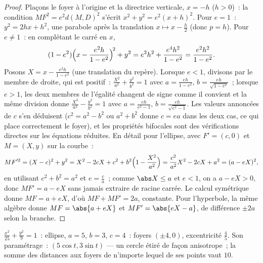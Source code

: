 \begin{proof}
Plaçons le foyer à l'origine et la directrice verticale, $x = -h$
($h > 0$)~: la condition $MF^2 = e^2 d(M, D)^2$ s'écrit $x^2 + y^2 =
e^2 (x + h)^2$. Pour $e = 1$~: $y^2 = 2hx + h^2$, une parabole après la
translation $x \mapsto x - \frac h2$ (donc $p = h$). Pour $e \neq 1$~:
en complétant le carré en $x$,
\[
(1 - e^2)\Bigl(x - \frac{e^2 h}{1 - e^2}\Bigr)^{\!2} + y^2
= e^2h^2 + \frac{e^4 h^2}{1 - e^2}
= \frac{e^2 h^2}{1 - e^2} .
\]
Posons $X = x - \frac{e^2h}{1-e^2}$ (une translation du repère). Lorsque $e < 1$,
divisons par le membre de droite, qui est positif~:
$\frac{X^2}{a^2} + \frac{y^2}{b^2} = 1$ avec $a = \frac{eh}{1 -
e^2}$, $b = \frac{eh}{\sqrt{1-e^2}}$~; lorsque $e > 1$, les deux membres
de l'égalité changent de signe comme il convient et la même division donne
$\frac{X^2}{a^2} - \frac{y^2}{b^2} = 1$ avec $a = \frac{eh}{e^2 -
1}$, $b = \frac{eh}{\sqrt{e^2 - 1}}$. Les valeurs annoncées de $c$
s'en déduisent ($c^2 = a^2 - b^2$ ou $a^2 + b^2$ donne $c = ea$ dans les
deux cas, ce qui place correctement le foyer), et les propriétés bifocales sont
des vérifications directes sur les équations réduites. En détail pour
l'ellipse, avec $F' = (c, 0)$ et $M = (X, y)$ sur la courbe~:
\[
MF'^2 = (X - c)^2 + y^2
= X^2 - 2cX + c^2 + b^2\Bigl(1 - \frac{X^2}{a^2}\Bigr)
= \frac{c^2}{a^2}X^2 - 2cX + a^2
= (a - eX)^2 ,
\]
en utilisant $c^2 + b^2 = a^2$ et $e = \frac ca$~; comme $\abs X \leq
a$ et $e < 1$, on a $a - eX > 0$, donc $MF' = a - eX$ sans jamais extraire
de racine carrée. Le calcul symétrique donne $MF = a + eX$,
d'où $MF + MF' = 2a$, constante. Pour l'hyperbole, la même
algèbre donne $MF = \abs{a + eX}$ et $MF' = \abs{eX - a}$,
de différence $\pm2a$ selon la branche.
\end{proof}

\begin{example}\label{ex:b1:curves:conicexample}
$\frac{x^2}{25} + \frac{y^2}{9} = 1$~: ellipse, $a = 5$, $b = 3$, $c
= 4$~: foyers $(\pm4, 0)$, excentricité $\frac45$. Son paramétrage~:
$(5\cos t, 3\sin t)$ --- un cercle étiré de façon anisotrope~; la
somme des distances aux foyers de n'importe lequel de ses points vaut $10$.
\end{example}

